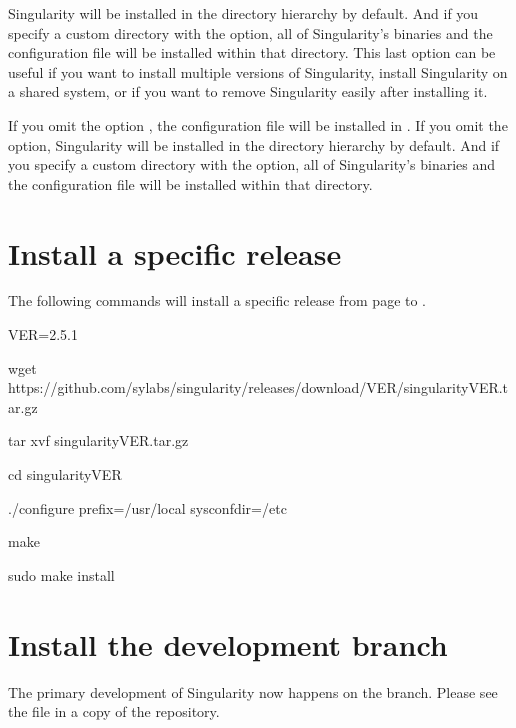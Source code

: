 \documentclass[letterpaper,10pt,english]{sphinxmanual}
\begin{document}
Singularity will be installed in the  directory hierarchy by default.
And if you specify a custom directory with the  option, all of
Singularity’s binaries and the configuration file will be installed within that
directory. This last option can be useful if you want to install multiple versions
of Singularity, install Singularity on a shared system, or if you want to remove
Singularity easily after installing it.

If you omit the  option , the configuration file will be installed in .
If you omit the  option, Singularity will be installed in the  directory
hierarchy by default. And if you specify a custom directory with the 
option, all of Singularity’s binaries and the configuration file will be installed within that directory.


\section{Install a specific release}
\label{\detokenize{installation:install-a-specific-release}}
The following commands will install a specific release from  page to .

%
\begin{sphinxVerbatim}[commandchars=\\\{\}]
\PYGZdl{} VER=2.5.1

\PYGZdl{} wget https://github.com/sylabs/singularity/releases/download/\PYGZdl{}VER/singularity\PYGZhy{}\PYGZdl{}VER.tar.gz

\PYGZdl{} tar xvf singularity\PYGZhy{}\PYGZdl{}VER.tar.gz

\PYGZdl{} cd singularity\PYGZhy{}\PYGZdl{}VER

\PYGZdl{} ./configure \PYGZhy{}\PYGZhy{}prefix=/usr/local \PYGZhy{}\PYGZhy{}sysconfdir=/etc

\PYGZdl{} make

\PYGZdl{} sudo make install
\end{sphinxVerbatim}


\section{Install the development branch}
\label{\detokenize{installation:install-the-development-branch}}
The primary development of Singularity now happens on the  branch.
Please see the  file in a copy of the repository.
\end{document}
